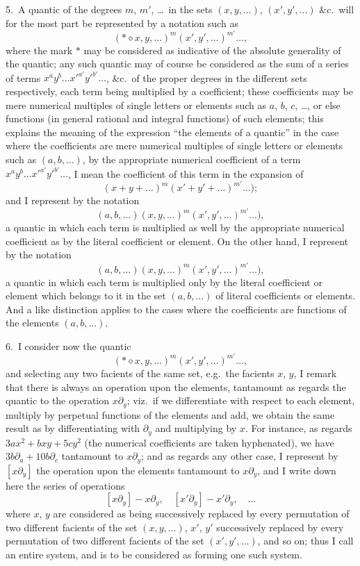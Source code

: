 \documentclass[11pt,a4paper]{article}
\begin{document}
5.\ A quantic of the degrees $m$, $m'$, \ldots\ in the sets $(x, y, \ldots)$, $(x', y', \ldots)$ \&c.\ will for the most part be represented by a notation such as
\[
(*\diamond x, y, \ldots)^m (x', y', \ldots)^{m'} \ldots,
\]
where the mark $*$ may be considered as indicative of the absolute generality of the quantic; any such quantic may of course be considered as the sum of a series of terms $x^a y^b \ldots x'^{a'} y'^{b'} \ldots$, \&c.\ of the proper degrees in the different sets respectively, each term being multiplied by a coefficient; these coefficients may be mere numerical multiples of single letters or elements such as $a$, $b$, $c$, \ldots, or else functions (in general rational and integral functions) of such elements; this explains the meaning of the expression ``the elements of a quantic'' in the case where the coefficients are mere numerical multiples of single letters or elements such as $(a, b, \ldots)$, by the appropriate numerical coefficient of a term $x^a y^b \ldots x'^{a'} y'^{b'} \ldots$, I mean the coefficient of this term in the expansion of
\[
(x + y + \ldots)^m (x' + y' + \ldots)^{m'} \ldots);
\]
and I represent by the notation
\[
(a, b, \ldots)(x, y, \ldots)^m (x', y', \ldots)^{m'} \ldots),
\]
a quantic in which each term is multiplied as well by the appropriate numerical coefficient as by the literal coefficient or element. On the other hand, I represent by the notation
\[
(a, b, \ldots)(x, y, \ldots)^m (x', y', \ldots)^{m'} \ldots),
\]
a quantic in which each term is multiplied only by the literal coefficient or element which belongs to it in the set $(a, b, \ldots)$ of literal coefficients or elements. And a like distinction applies to the cases where the coefficients are functions of the elements $(a, b, \ldots)$.

\medskip

6.\ I consider now the quantic
\[
(*\diamond x, y, \ldots)^m (x', y', \ldots)^{m'} \ldots,
\]
and selecting any two facients of the same set, e.g.\ the facients $x$, $y$, I remark that there is always an operation upon the elements, tantamount as regards the quantic to the operation $x\partial_y$; viz.\ if we differentiate with respect to each element, multiply by perpetual functions of the elements and add, we obtain the same result as by differentiating with $\partial_y$ and multiplying by $x$. For instance, as regards $3ax^2 + bxy + 5cy^2$ (the numerical coefficients are taken hyphenated), we have $3b\partial_a + 10b\partial_c$ tantamount to $x\partial_y$; and as regards any other case, I represent by $[x\partial_y]$ the operation upon the elements tantamount to $x\partial_y$, and I write down here the series of operations
\[
[x\partial_y] - x\partial_y,\quad [x'\partial_y] - x'\partial_y,\quad\ldots
\]
where $x$, $y$ are considered as being successively replaced by every permutation of two different facients of the set $(x, y, \ldots)$, $x'$, $y'$ successively replaced by every permutation of two different facients of the set $(x', y', \ldots)$, and so on; thus I call an entire system, and is to be considered as forming one such system.
\end{document}
